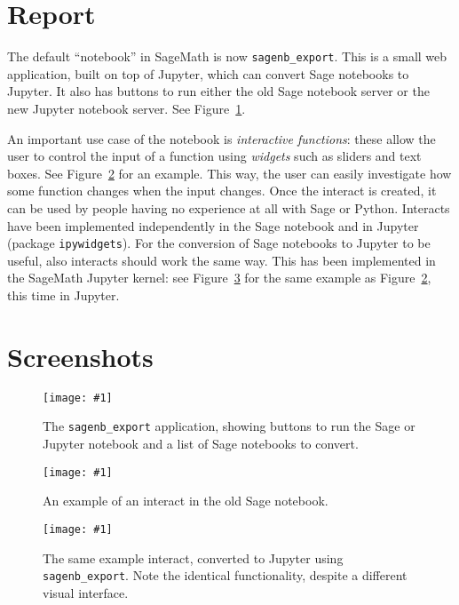 \documentclass{deliverablereport}
\author{Florent Cayr\'e, Jeroen Demeyer, Nicolas M. Thi\'ery}
\begin{document}
\maketitle
\githubissuedescription
\tableofcontents

\section{Report}
The default ``notebook'' in SageMath is now \texttt{sagenb\_export}.
This is a small web application, built on top of Jupyter,
which can convert Sage notebooks to Jupyter.
It also has buttons to run either the
old Sage notebook server or the new Jupyter notebook server.
See Figure~\ref{fig-export}.

An important use case of the notebook is \emph{interactive functions}:
these allow the user to control the input of a function
using \emph{widgets} such as sliders and text boxes.
See Figure~\ref{fig-interact-sagenb} for an example.
This way, the user can easily investigate how some function changes
when the input changes.
Once the interact is created, it can be used by people having no experience
at all with Sage or Python.
Interacts have been implemented independently in the Sage notebook
and in Jupyter (package \texttt{ipywidgets}).
For the conversion of Sage notebooks to Jupyter to be useful,
also interacts should work the same way.
This has been implemented in the SageMath Jupyter kernel:
see Figure~\ref{fig-interact-jupyter} for the same example as
Figure~\ref{fig-interact-sagenb}, this time in Jupyter.

\appendix
\section{Screenshots}
\newcommand{\screenshot}[2]{
\begin{figure}[ht]
  \texttt{[image: \#1]}
  \caption{#2}
\end{figure}}

\screenshot{export.png}{\label{fig-export}
  The \texttt{sagenb\_export} application, showing
  buttons to run the Sage or Jupyter notebook and a list of Sage notebooks
  to convert.}
\screenshot{interact-sagenb.png}{\label{fig-interact-sagenb}
  An example of an interact in the old Sage notebook.}
\screenshot{interact-jupyter.png}{\label{fig-interact-jupyter}
  The same example interact, converted to Jupyter using \texttt{sagenb\_export}.
  Note the identical functionality, despite a different visual interface.}
\end{document}
